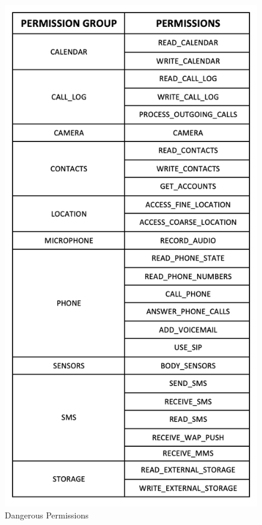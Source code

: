 \documentclass[12pt,twoside]{report}
\begin{document}
\begin{figure}
    \centering
    \includegraphics{figures/Dangerous_Permissions.png}
    \caption{Dangerous Permissions}
    \label{fig:my_label}
\end{figure}
\end{document}
